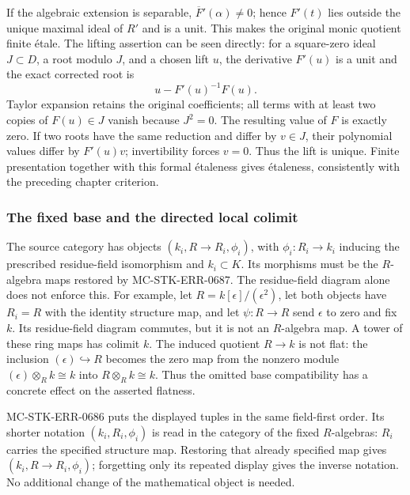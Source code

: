 If the algebraic extension is separable, \(\overline F'(\alpha)\ne0\); hence \(F'(t)\) lies outside the unique maximal ideal of \(R'\) and is a unit. This makes the original monic quotient finite étale. The lifting assertion can be seen directly: for a square-zero ideal \(J\subset D\), a root modulo \(J\), and a chosen lift \(u\), the derivative \(F'(u)\) is a unit and the exact corrected root is \[
 u-F'(u)^{-1}F(u).
\] Taylor expansion retains the original coefficients; all terms with at least two copies of \(F(u)\in J\) vanish because \(J^2=0\). The resulting value of \(F\) is exactly zero. If two roots have the same reduction and differ by \(v\in J\), their polynomial values differ by \(F'(u)v\); invertibility forces \(v=0\). Thus the lift is unique. Finite presentation together with this formal étaleness gives étaleness, consistently with the preceding chapter criterion.

\subsubsection{The fixed base and the directed local colimit}\label{the-fixed-base-and-the-directed-local-colimit}

The source category has objects \((k_i,R\to R_i,\phi_i)\), with \(\phi_i:R_i\to k_i\) inducing the prescribed residue-field isomorphism and \(k_i\subset K\). Its morphisms must be the \(R\)-algebra maps restored by MC-STK-ERR-0687. The residue-field diagram alone does not enforce this. For example, let \(R=k[\epsilon]/(\epsilon^2)\), let both objects have \(R_i=R\) with the identity structure map, and let \(\psi:R\to R\) send \(\epsilon\) to zero and fix \(k\). Its residue-field diagram commutes, but it is not an \(R\)-algebra map. A tower of these ring maps has colimit \(k\). The induced quotient \(R\to k\) is not flat: the inclusion \((\epsilon)\hookrightarrow R\) becomes the zero map from the nonzero module \((\epsilon)\otimes_R k\cong k\) into \(R\otimes_R k\cong k\). Thus the omitted base compatibility has a concrete effect on the asserted flatness.

MC-STK-ERR-0686 puts the displayed tuples in the same field-first order. Its shorter notation \((k_i,R_i,\phi_i)\) is read in the category of the fixed \(R\)-algebras: \(R_i\) carries the specified structure map. Restoring that already specified map gives \((k_i,R\to R_i,\phi_i)\); forgetting only its repeated display gives the inverse notation. No additional change of the mathematical object is needed.

